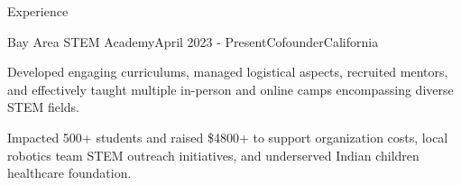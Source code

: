 \documentclass[
  11pt, %
]{public/resume/resume} %
\begin{document}
\begin{rSection}{Experience}
\begin{rSubsection}{Bay Area STEM Academy}{April 2023 - Present}{Cofounder}{California}
    \item Developed engaging curriculums, managed logistical aspects, recruited mentors, and effectively taught multiple in-person and online camps encompassing diverse STEM fields.
    
    \item Impacted 500+ students and raised \$4800+ to support organization costs, local robotics team STEM outreach initiatives, and underserved Indian children healthcare foundation.
    
  \end{rSubsection}
        
	
\end{rSection}

\end{document}
